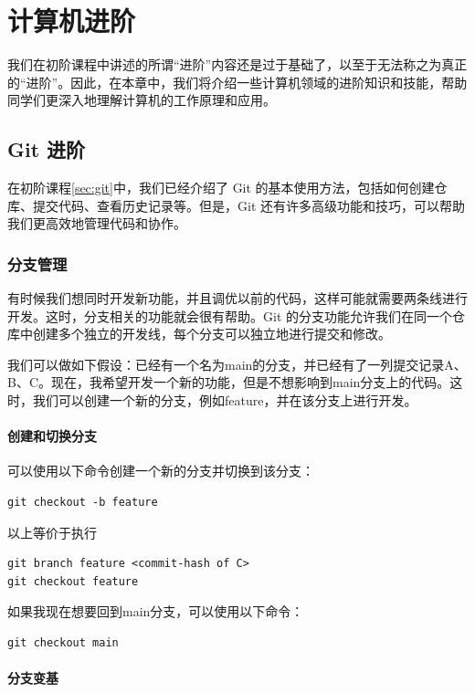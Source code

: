 \documentclass[../main.tex]{subfiles}
\begin{document}
\chapter{计算机进阶}

我们在初阶课程中讲述的所谓“进阶”内容还是过于基础了，以至于无法称之为真正的“进阶”。因此，在本章中，我们将介绍一些计算机领域的进阶知识和技能，帮助同学们更深入地理解计算机的工作原理和应用。

\section{Git 进阶}\label{sec:git-advanced}

在初阶课程\ref{sec:git}中，我们已经介绍了 Git 的基本使用方法，包括如何创建仓库、提交代码、查看历史记录等。但是，Git 还有许多高级功能和技巧，可以帮助我们更高效地管理代码和协作。

\subsection{分支管理}

有时候我们想同时开发新功能，并且调优以前的代码，这样可能就需要两条线进行开发。这时，分支相关的功能就会很有帮助。Git 的分支功能允许我们在同一个仓库中创建多个独立的开发线，每个分支可以独立地进行提交和修改。

我们可以做如下假设：已经有一个名为main的分支，并已经有了一列提交记录A、B、C。现在，我希望开发一个新的功能，但是不想影响到main分支上的代码。这时，我们可以创建一个新的分支，例如feature，并在该分支上进行开发。

\subsubsection{创建和切换分支}

可以使用以下命令创建一个新的分支并切换到该分支：
\begin{verbatim}
git checkout -b feature
\end{verbatim}

以上等价于执行
\begin{verbatim}
git branch feature <commit-hash of C>
git checkout feature
\end{verbatim}

如果我现在想要回到main分支，可以使用以下命令：
\begin{verbatim}
git checkout main
\end{verbatim}

\subsubsection{分支变基}
\end{document}
